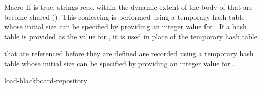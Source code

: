 \documentclass[10pt,twoside,english,pdftex]{article}
\begin{document}
\begin{functiondoc}{Macro}
If  is true, strings read within the dynamic
extent of the body of  that are  become
shared ().  This coalescing is performed using a temporary hash-table
whose initial size can be specified by providing an integer value for
. If a hash table is provided as the value for
, it is used in place of the temporary hash
table.

 that are referenced before they are defined are
recorded using a temporary hash table whose initial size can be specified by
providing an integer value for .

\begin{alsos}{load-blackboard-repository}
\end{alsos}

\end{functiondoc}

\end{document}
